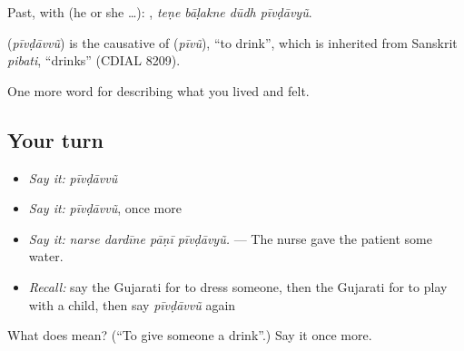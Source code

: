 Past, with  (he or she …):    , \emph{teṇe bāḷakne dūdh pīvḍāvyũ}.

\begin{cousinweb}
\textbf{} (\emph{pīvḍāvvũ}) is the causative of \textbf{} (\emph{pīvũ}), \textquotedblleft{}to drink\textquotedblright{}, which is inherited from Sanskrit \emph{pibati}, \textquotedblleft{}drinks\textquotedblright{} (CDIAL 8209).
\end{cousinweb}

\begin{grammarlens}[title={What you've built}]
One more word for describing what you lived and felt.
\end{grammarlens}

\subsection*{Your turn}
\begin{itemize}
\raggedright
  \item \emph{Say it:} \emph{pīvḍāvvũ}
  \item \emph{Say it:} \emph{pīvḍāvvũ}, once more
  \item \emph{Say it:} \emph{narse dardīne pāṇī pīvḍāvyũ.} — The nurse gave the patient some water.
  \item \emph{Recall:} say the Gujarati for to dress someone, then the Gujarati for to play with a child, then say \emph{pīvḍāvvũ} again
\end{itemize}

\begin{tcolorbox}[breakable,colback=teal!4,colframe=teal!35!black,title={Before you move on}]
What does  mean? (\textquotedblleft{}To give someone a drink\textquotedblright{}.) Say it once more.
\end{tcolorbox}
